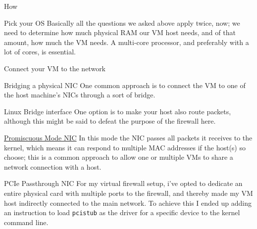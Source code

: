 \documentclass[bigger]{beamer}
\begin{document}
\begin{frame}[fragile,label={sec:org80a262d}]{How}
 \begin{block}{Pick your OS}
Basically all the questions we asked above apply twice, now; we need to
determine how much physical RAM our VM host needs, and of that amount, how much
the VM needs. A multi-core processor, and preferably with a lot of cores, is
essential.
\end{block}

\begin{block}{Connect your VM to the network}
\begin{block}{Bridging a physical NIC}
One common approach is to connect the VM to one of the host machine's NICs
through a sort of bridge.

\begin{block}{Linux Bridge interface}
One option is to make your host also route packets, although this might be said
to defeat the purpose of the firewall here.
\end{block}

\begin{block}{\href{https://en.wikipedia.org/wiki/Promiscuous\_mode}{Promiscuous Mode NIC}}
In this mode the NIC passes all packets it receives to the kernel, which means
it can respond to multiple MAC addresses if the host(s) so choose; this is a
common approach to allow one or multiple VMs to share a network connection with
a host.
\end{block}
\end{block}

\begin{block}{PCIe Passthrough NIC}
For my virtual firewall setup, i've opted to dedicate an entire physical card
with multiple ports to the firewall, and thereby made my VM host indirectly
connected to the main network. To achieve this I ended up adding an instruction
to load \texttt{pcistub} as the driver for a specific device to the kernel command
line.
\end{block}
\end{block}
\end{frame}
\end{document}
